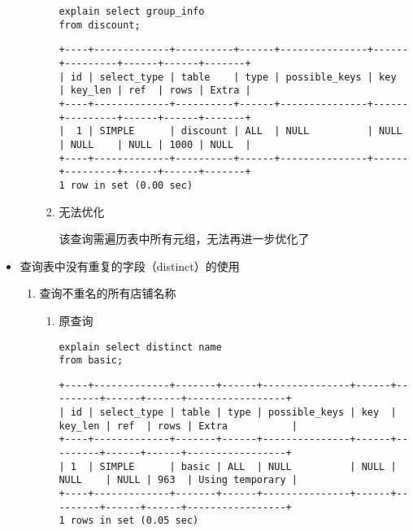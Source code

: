 \documentclass[11pt]{article}
\begin{document}
\begin{itemize}
\begin{enumerate}
\begin{enumerate}
\begin{lstlisting}
explain select group_info
from discount;
\end{lstlisting}

\begin{verbatim}
+----+-------------+----------+------+---------------+------+---------+------+------+-------+
| id | select_type | table    | type | possible_keys | key  | key_len | ref  | rows | Extra |
+----+-------------+----------+------+---------------+------+---------+------+------+-------+
|  1 | SIMPLE      | discount | ALL  | NULL          | NULL | NULL    | NULL | 1000 | NULL  |
+----+-------------+----------+------+---------------+------+---------+------+------+-------+
1 row in set (0.00 sec)
\end{verbatim}

\item 无法优化

该查询需遍历表中所有元组，无法再进一步优化了
\end{enumerate}
\end{enumerate}
\item 查询表中没有重复的字段（distinct）的使用
\label{sec-3-2-1-3}
\begin{enumerate}
\item 查询不重名的所有店铺名称
\begin{enumerate}
\item 原查询

\begin{lstlisting}
explain select distinct name
from basic;
\end{lstlisting}

\begin{verbatim}
+----+-------------+-------+------+---------------+------+---------+------+------+-----------------+
| id | select_type | table | type | possible_keys | key  | key_len | ref  | rows | Extra           |
+----+-------------+-------+------+---------------+------+---------+------+------+-----------------+
| 1  | SIMPLE      | basic | ALL  | NULL          | NULL | NULL    | NULL | 963  | Using temporary |
+----+-------------+-------+------+---------------+------+---------+------+------+-----------------+
1 rows in set (0.05 sec)
\end{verbatim}


\end{enumerate}
\end{enumerate}
\end{itemize}
\end{document}
